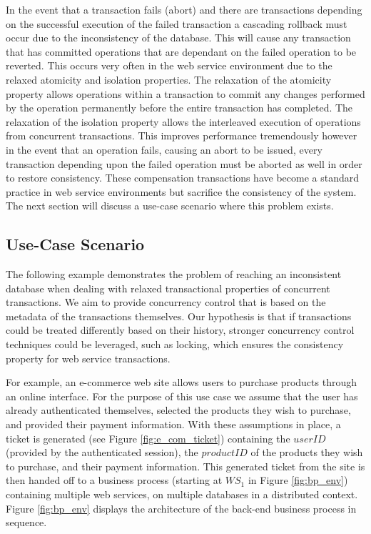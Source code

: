 \documentclass[conference]{IEEEtran}
\begin{document}
In the event that a transaction fails (abort) and there are transactions depending on the successful execution of the failed transaction a cascading rollback must occur due to the inconsistency of the database. This will cause any transaction that has committed operations that are dependant on the failed operation to be reverted. This occurs very often in the web service environment due to the relaxed atomicity and isolation properties. The relaxation of the atomicity property allows operations within a transaction to commit any changes performed by the operation permanently before the entire transaction has completed. The relaxation of the isolation property allows the interleaved execution of operations from concurrent transactions. This improves performance tremendously however in the event that an operation fails, causing an abort to be issued, every transaction depending upon the failed operation must be aborted as well in order to restore consistency. These compensation transactions have become a standard practice in web service environments but sacrifice the consistency of the system. The next section will discuss a use-case scenario where this problem exists.

\subsection{Use-Case Scenario}
The following example demonstrates the problem of reaching an inconsistent database when dealing with relaxed transactional properties of concurrent transactions. We aim to provide concurrency control that is based on the metadata of the transactions themselves. Our hypothesis is that if transactions could be treated differently based on their history, stronger concurrency control techniques could be leveraged, such as locking, which ensures the consistency property for web service transactions.

For example, an e-commerce web site allows users to purchase products through an online interface. For the purpose of this use case we assume that the user has already authenticated themselves, selected the products they wish to purchase, and provided their payment information. With these assumptions in place, a ticket is generated (see Figure \ref{fig:e_com_ticket}) containing the $userID$ (provided by the authenticated session), the $productID$ of the products they wish to purchase, and their payment information. This generated ticket from the site is then handed off to a business process (starting at $WS_{1}$ in Figure \ref{fig:bp_env}) containing multiple web services, on multiple databases in a distributed context. Figure \ref{fig:bp_env} displays the architecture of the back-end business process in sequence.
\end{document}
